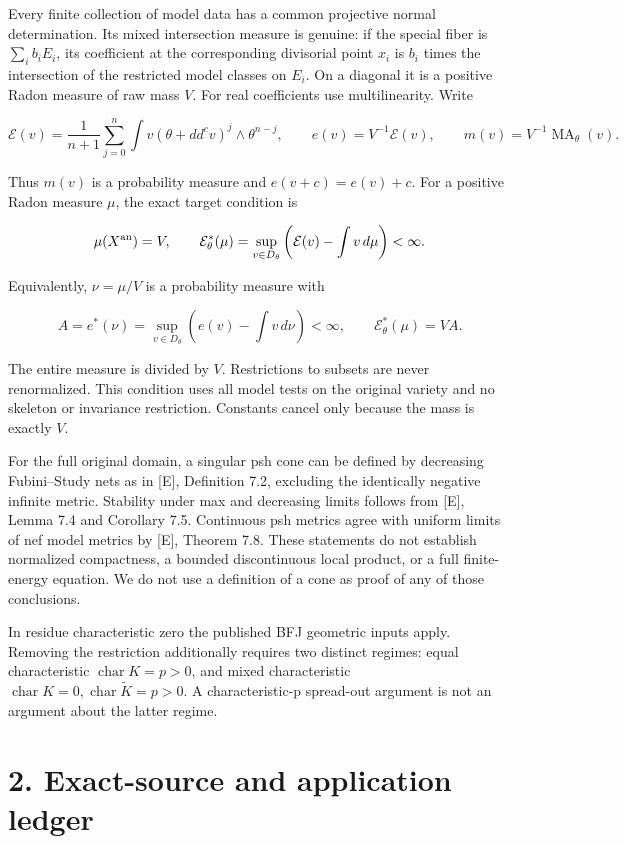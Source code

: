 \documentclass[11pt]{article}
\newcommand{\MA}{\operatorname{MA}}
\begin{document}
Every finite collection of model data has a common projective normal determination. Its mixed intersection measure is genuine: if the special fiber is \(\sum_i b_iE_i\), its coefficient at the corresponding divisorial point \(x_i\) is \(b_i\) times the intersection of the restricted model classes on \(E_i\). On a diagonal it is a positive Radon measure of raw mass \(V\). For real coefficients use multilinearity. Write

\[
\mathcal E(v)=\frac1{n+1}\sum_{j=0}^n
 \int v(\theta+dd^cv)^j\wedge\theta^{n-j},
\qquad e(v)=V^{-1}\mathcal E(v),\qquad m(v)=V^{-1}\MA_\theta(v).
\]

Thus \(m(v)\) is a probability measure and \(e(v+c)=e(v)+c\). For a positive Radon measure \(\mu\), the exact target condition is

\[
\mu(X^{\rm an})=V,\qquad
\mathcal E_\theta^*(\mu)=
\sup_{v\in D_\theta}\left(\mathcal E(v)-\int v\,d\mu\right)<\infty.
\]

Equivalently, \(\nu=\mu/V\) is a probability measure with

\[
A=e^*(\nu)=\sup_{v\in D_\theta}\left(e(v)-\int v\,d\nu\right)<\infty,
\qquad\mathcal E_\theta^*(\mu)=VA.
\]

The entire measure is divided by \(V\). Restrictions to subsets are never renormalized. This condition uses all model tests on the original variety and no skeleton or invariance restriction. Constants cancel only because the mass is exactly \(V\).

For the full original domain, a singular psh cone can be defined by decreasing Fubini--Study nets as in [E], Definition 7.2, excluding the identically negative infinite metric. Stability under max and decreasing limits follows from [E], Lemma 7.4 and Corollary 7.5. Continuous psh metrics agree with uniform limits of nef model metrics by [E], Theorem 7.8. These statements do not establish normalized compactness, a bounded discontinuous local product, or a full finite-energy equation. We do not use a definition of a cone as proof of any of those conclusions.

In residue characteristic zero the published BFJ geometric inputs apply. Removing the restriction additionally requires two distinct regimes: equal characteristic \(\operatorname{char}K=p>0\), and mixed characteristic \(\operatorname{char}K=0,\operatorname{char}\widetilde K=p>0\). A characteristic-p spread-out argument is not an argument about the latter regime.

\section*{2. Exact-source and application ledger}
\end{document}
